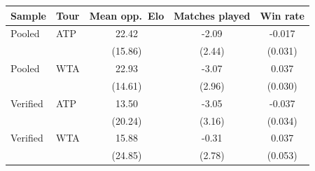 \begin{tabular}{ll*{3}{c}}
\toprule
Sample & Tour & Mean opp.\ Elo & Matches played & Win rate \\
\midrule
Pooled & ATP & 22.42 & -2.09 & -0.017 \\
 & & (15.86) & (2.44) & (0.031) \\[0.3em]
Pooled & WTA & 22.93 & -3.07 & 0.037 \\
 & & (14.61) & (2.96) & (0.030) \\[0.3em]
Verified & ATP & 13.50 & -3.05 & -0.037 \\
 & & (20.24) & (3.16) & (0.034) \\[0.3em]
Verified & WTA & 15.88 & -0.31 & 0.037 \\
 & & (24.85) & (2.78) & (0.053) \\[0.3em]
\bottomrule
\end{tabular}
